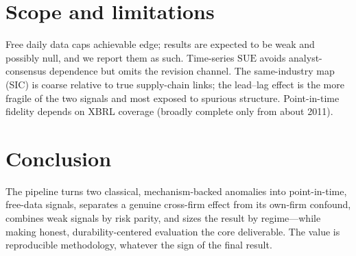 \documentclass[11pt,a4paper]{article}
\theoremstyle{plain}
\theoremstyle{definition}
\newcommand{\SUE}{\mathrm{SUE}}
\begin{document}
\section{Scope and limitations}
\label{sec:scope}
Free daily data caps achievable edge; results are expected to be weak and possibly null, and we
report them as such. Time-series $\SUE$ avoids analyst-consensus dependence but omits the
revision channel. The same-industry map (SIC) is coarse relative to true supply-chain links; the
lead--lag effect is the more fragile of the two signals and most exposed to spurious structure.
Point-in-time fidelity depends on XBRL coverage (broadly complete only from about 2011).

\section{Conclusion}
\label{sec:conclusion}
The pipeline turns two classical, mechanism-backed anomalies into point-in-time, free-data signals,
separates a genuine cross-firm effect from its own-firm confound, combines weak signals by risk
parity, and sizes the result by regime---while making honest, durability-centered evaluation the
core deliverable. The value is reproducible methodology, whatever the sign of the final result.
\end{document}
